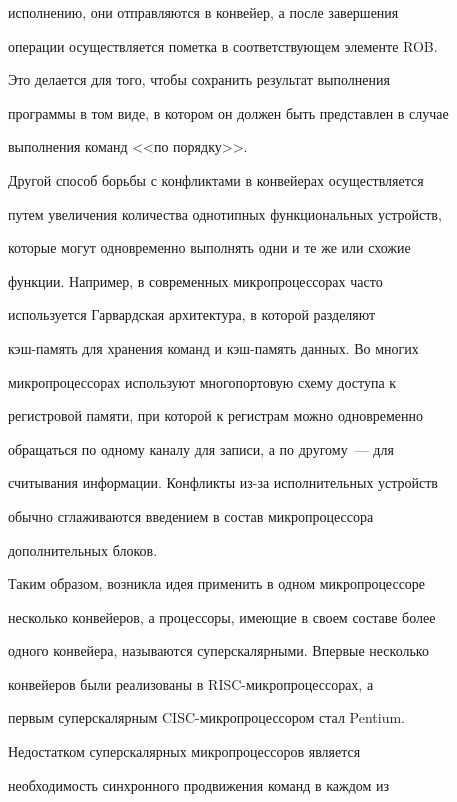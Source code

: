 исполнению, они отправляются в конвейер, а после завершения 


операции осуществляется пометка в соответствующем элементе ROB. 


Это делается для того, чтобы сохранить результат выполнения 


программы в том виде, в котором он должен быть представлен в случае 


выполнения команд <<по порядку>>.


  


 Другой способ борьбы с конфликтами в конвейерах осуществляется 


путем увеличения количества однотипных функциональных устройств, 


которые могут одновременно выполнять одни и те же или схожие 


функции. Например, в современных микропроцессорах часто 


используется Гарвардская архитектура, в которой разделяют 


кэш-память для хранения команд и кэш-па\-мять данных. Во многих 


микропроцессорах используют многопортовую схему доступа к 


регистровой памяти, при которой к регистрам можно одновременно 


обращаться по одному каналу для записи, а по другому~--- для 


считывания информации. Конфликты из-за исполнительных устройств 


обычно сглаживаются введением в состав микропроцессора 


дополнительных блоков. 





Таким образом, возникла идея применить в одном микропроцессоре 


несколько конвейеров,  а процессоры, имеющие в своем составе более 


одного конвейера, называются суперскалярными. Впервые несколько 


конвейеров были реализованы в RISC-мик\-ро\-про\-цес\-со\-рах, а 


первым суперскалярным CISC-мик\-ро\-про\-цес\-со\-ром стал Pentium. 





Недостатком суперскалярных микропроцессоров является 


необходимость синхронного продвижения команд в каждом из 


